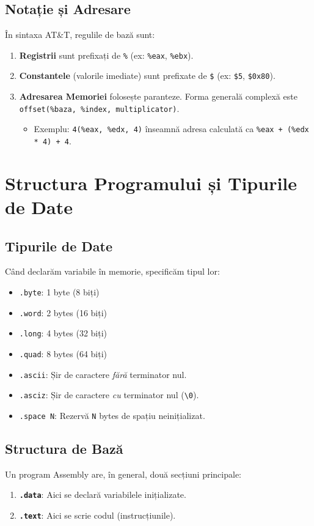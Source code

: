 \documentclass[12pt]{article}
\begin{document}
\subsection{Notație și Adresare}
În sintaxa AT\&T, regulile de bază sunt:
\begin{enumerate}
    \item \textbf{Registrii} sunt prefixați de \texttt{\%} (ex: \texttt{\%eax}, \texttt{\%ebx}).
    \item \textbf{Constantele} (valorile imediate) sunt prefixate de \texttt{\$} (ex: \texttt{\$5}, \texttt{\$0x80}).
    \item \textbf{Adresarea Memoriei} folosește paranteze. Forma generală complexă este \texttt{offset(\%baza, \%index, multiplicator)}.
    \begin{itemize}
        \item Exemplu: \texttt{4(\%eax, \%edx, 4)} înseamnă adresa calculată ca \texttt{\%eax + (\%edx * 4) + 4}.
    \end{itemize}
\end{enumerate}

\section{Structura Programului și Tipurile de Date}

\subsection{Tipurile de Date}
Când declarăm variabile în memorie, specificăm tipul lor:
\begin{itemize}
    \item \texttt{.byte}: 1 byte (8 biți)
    \item \texttt{.word}: 2 bytes (16 biți)
    \item \texttt{.long}: 4 bytes (32 biți)
    \item \texttt{.quad}: 8 bytes (64 biți)
    \item \texttt{.ascii}: Șir de caractere \textit{fără} terminator nul.
    \item \texttt{.asciz}: Șir de caractere \textit{cu} terminator nul (\texttt{\textbackslash 0}).
    \item \texttt{.space N}: Rezervă \texttt{N} bytes de spațiu neinițializat.
\end{itemize}

\subsection{Structura de Bază}
Un program Assembly are, în general, două secțiuni principale:
\begin{enumerate}
    \item \textbf{\texttt{.data}}: Aici se declară variabilele inițializate.
    \item \textbf{\texttt{.text}}: Aici se scrie codul (instrucțiunile).
\end{enumerate}
\end{document}
